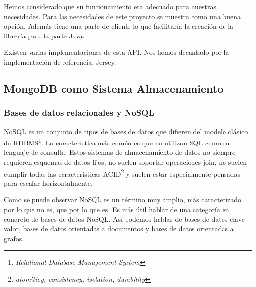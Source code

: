 Hemos considerado que su funcionamiento era adecuado para nuestras
necesidades. Para las necesidades de este proyecto se muestra como una
buena opción. Además tiene una parte de cliente lo que facilitaría la
creación de la librería para la parte Java.

Existen varias implementaciones de esta API. Nos hemos decantado por
la implementación de referencia, Jersey\cite{JERSEY}.

\subsection{MongoDB como Sistema Almacenamiento}
\subsubsection{Bases de datos relacionales y NoSQL}

NoSQL es un conjunto de tipos de bases de datos que difieren del
modelo clásico de RDBMS\footnote{\emph{Relational Database Management
    System}}. La característica más común es que no utilizan SQL como
su lenguaje de consulta. Estos sistemas de almacenamiento de datos no
siempre requieren esquemas de datos fijos, no suelen soportar
operaciones join, no suelen cumplir todas las características
ACID\footnote{\emph{atomiticy, consistency, isolation, durability}} y
suelen estar especialmente pensadas para escalar horizontalmente.

Como se puede observar NoSQL es un término muy amplio, más
caracterizado por lo que no es, que por lo que es. Es más útil hablar
de una categoría en concreto de bases de datos NoSQL. Así podemos
hablar de bases de datos clave-valor, bases de datos orientadas a
documentos y bases de datos orientadas a grafos.

